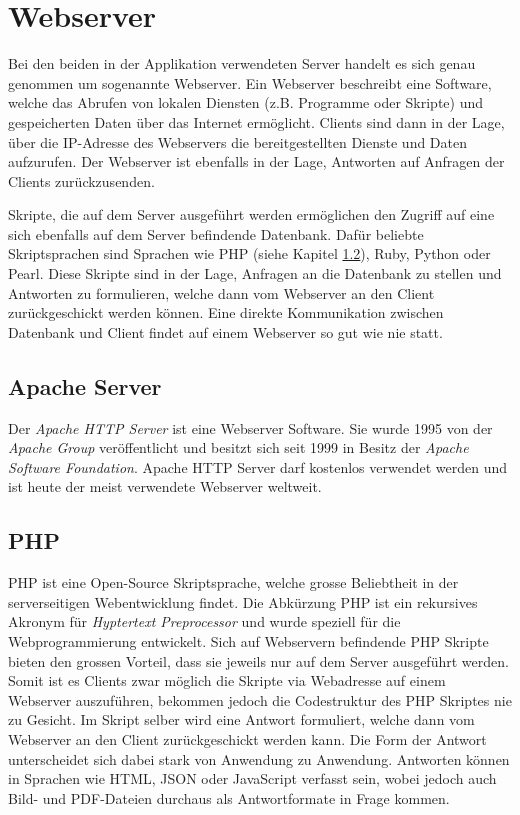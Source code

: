 \documentclass[../main.tex]{subfiles}
\begin{document}
	\section{Webserver}
	Bei den beiden in der Applikation verwendeten Server handelt es sich genau genommen um sogenannte Webserver. Ein Webserver beschreibt eine Software, welche das Abrufen von lokalen Diensten (z.B. Programme oder Skripte) und gespeicherten Daten über das Internet ermöglicht. Clients sind dann in der Lage, über die IP-Adresse des Webservers die bereitgestellten Dienste und Daten aufzurufen. Der Webserver ist ebenfalls in der Lage, Antworten auf Anfragen der Clients zurückzusenden. 
		
 	Skripte, die auf dem Server ausgeführt werden ermöglichen den Zugriff auf eine sich ebenfalls auf dem Server befindende Datenbank. Dafür beliebte Skriptsprachen sind Sprachen wie PHP (siehe Kapitel \ref{php}), Ruby, Python oder Pearl. Diese Skripte sind in der Lage, Anfragen an die Datenbank zu stellen und Antworten zu formulieren, welche dann vom Webserver an den Client zurückgeschickt werden können. Eine direkte Kommunikation zwischen Datenbank und Client findet auf einem Webserver so gut wie nie statt.
	
	\subsection{Apache Server}
	Der \emph{Apache HTTP Server} ist eine Webserver Software. Sie wurde 1995 von der \emph{Apache Group} veröffentlicht und besitzt sich seit 1999 in Besitz der \emph{Apache Software Foundation}. Apache HTTP Server darf kostenlos verwendet werden und ist heute der meist verwendete Webserver weltweit. \cite{apache}
	
	\subsection{PHP}\label{php}
	PHP ist eine Open-Source Skriptsprache, welche grosse Beliebtheit in der serverseitigen Webentwicklung findet. Die Abkürzung PHP ist ein rekursives Akronym für \emph{Hyptertext Preprocessor} und wurde speziell für die Webprogrammierung entwickelt. Sich auf Webservern befindende PHP Skripte bieten den grossen Vorteil, dass sie jeweils nur auf dem Server ausgeführt werden. Somit ist es Clients zwar möglich die Skripte via Webadresse auf einem Webserver auszuführen, bekommen jedoch die Codestruktur des PHP Skriptes nie zu Gesicht. \cite{PHP} Im Skript selber wird eine Antwort formuliert, welche dann vom Webserver an den Client zurückgeschickt werden kann. Die Form der Antwort unterscheidet sich dabei stark von Anwendung zu Anwendung. Antworten können in Sprachen wie HTML, JSON oder JavaScript verfasst sein, wobei jedoch auch Bild- und PDF-Dateien durchaus als Antwortformate in Frage kommen. \cite{PHP:function}
	
\end{document}

